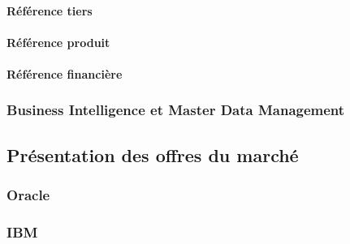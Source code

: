 \paragraph{Référence tiers}

\paragraph{Référence produit}

\paragraph{Référence financière}

\subsubsection{Business Intelligence et Master Data Management}

\subsection{Présentation des offres du marché}

\subsubsection{Oracle}

\subsubsection{IBM}


